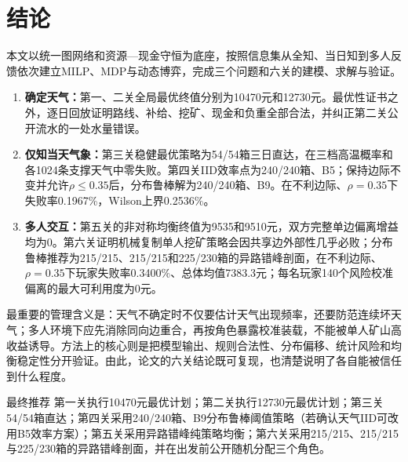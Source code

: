 \section{结论}

本文以统一图网络和资源—现金守恒为底座，按照信息集从全知、当日知到多人反馈依次建立MILP、MDP与动态博弈，完成三个问题和六关的建模、求解与验证。

\begin{enumerate}
  \item \textbf{确定天气：}第一、二关全局最优终值分别为10470元和12730元。最优性证书之外，逐日回放证明路线、补给、挖矿、现金和负重全部合法，并纠正第二关公开流水的一处水量错误。
  \item \textbf{仅知当天气象：}第三关稳健最优策略为54/54箱三日直达，在三档高温概率和各1024条支撑天气中零失败。第四关IID效率点为240/240箱、B5；保持边际不变并允许$\rho\le0.35$后，分布鲁棒解为240/240箱、B9。在不利边际、$\rho=0.35$下失败率0.1967\%，Wilson上界0.2536\%。
  \item \textbf{多人交互：}第五关的非对称均衡终值为9535和9510元，双方完整单边偏离增益均为0。第六关证明机械复制单人挖矿策略会因共享边外部性几乎必败；分布鲁棒推荐为215/215、215/215和225/230箱的异路错峰剖面，在不利边际、$\rho=0.35$下玩家失败率0.3400\%、总体均值7383.3元；每名玩家140个风险校准偏离的最大可利用度为0元。
\end{enumerate}

最重要的管理含义是：天气不确定时不仅要估计天气出现频率，还要防范连续坏天气；多人环境下应先消除同向边重合，再按角色暴露校准装载，不能被单人矿山高收益诱导。方法上的核心则是把模型输出、规则合法性、分布偏移、统计风险和均衡稳定性分开验证。由此，论文的六关结论既可复现，也清楚说明了各自能被信任到什么程度。

\begin{resultbox}{最终推荐}
第一关执行10470元最优计划；第二关执行12730元最优计划；第三关54/54箱直达；第四关采用240/240箱、B9分布鲁棒阈值策略（若确认天气IID可改用B5效率方案）；第五关采用异路错峰纯策略均衡；第六关采用215/215、215/215与225/230箱的异路错峰剖面，并在出发前公开随机分配三个角色。
\end{resultbox}
